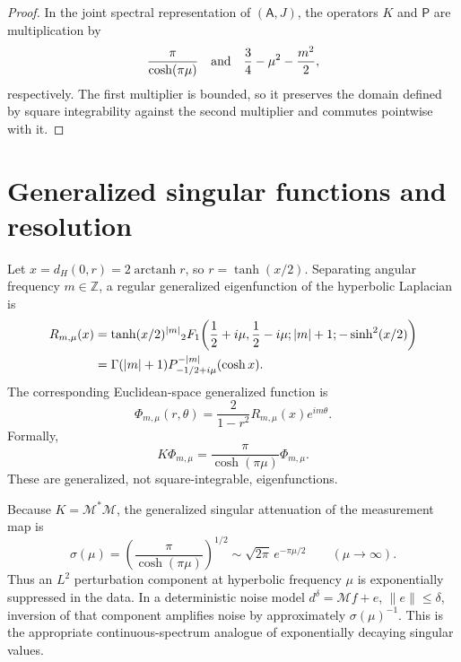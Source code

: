 \IfFileExists{iopjournal.cls}{\documentclass{iopjournal}}{\documentclass{iopjournal-draft}}
\theoremstyle{definition}
\theoremstyle{remark}
\newcommand{\norm}[1]{\lVert #1\rVert}
\newcommand{\Z}{\mathbb Z}
\numberwithin{equation}{section}
\begin{document}
\begin{proof}
In the joint spectral representation of $(\mathsf A,J)$, the operators $K$ and $\mathsf P$ are multiplication by
\[
 \frac{\pi}{\cosh(\pi\mu)}
 \quad\hbox{and}\quad
 \frac34-\mu^2-\frac{m^2}{2},
\]
respectively.  The first multiplier is bounded, so it preserves the domain defined by square integrability against the second multiplier and commutes pointwise with it.
\end{proof}

\section{Generalized singular functions and resolution}
\label{sec:singular-functions}

Let $x=d_H(0,r)=2\operatorname{arctanh}r$, so $r=\tanh(x/2)$.  Separating angular frequency $m\in\Z$, a regular generalized eigenfunction of the hyperbolic Laplacian is
\begin{align}
 R_{m,\mu}(x)
 &=\tanh(x/2)^{|m|}
 {}_2F_1\!\left(\frac12+i\mu,\frac12-i\mu;
 |m|+1;-\sinh^2(x/2)\right)\notag\\
 &=\Gamma(|m|+1)P_{-1/2+i\mu}^{-|m|}(\cosh x).
 \label{eq:radial-genfun}
\end{align}
The corresponding Euclidean-space generalized function is
\begin{equation}
 \Phi_{m,\mu}(r,\theta)
 =\frac{2}{1-r^2}R_{m,\mu}(x)e^{im\theta}.
 \label{eq:euclidean-genfun}
\end{equation}
Formally,
\begin{equation}
 K\Phi_{m,\mu}
 =\frac{\pi}{\cosh(\pi\mu)}\Phi_{m,\mu}.
 \label{eq:gen-eigen-K}
\end{equation}
These are generalized, not square-integrable, eigenfunctions.

Because $K=\mathcal{M}^*\mathcal{M}$, the generalized singular attenuation of the measurement map is
\begin{equation}
 \sigma(\mu)=\left(\frac{\pi}{\cosh(\pi\mu)}\right)^{1/2}
 \sim\sqrt{2\pi}\,e^{-\pi\mu/2}
 \qquad(\mu\to\infty).
 \label{eq:singular-attenuation}
\end{equation}
Thus an $L^2$ perturbation component at hyperbolic frequency $\mu$ is exponentially suppressed in the data.  In a deterministic noise model $d^\delta=\mathcal{M} f+e$, $\norm e\leq\delta$, inversion of that component amplifies noise by approximately $\sigma(\mu)^{-1}$.  This is the appropriate continuous-spectrum analogue of exponentially decaying singular values.
\end{document}
